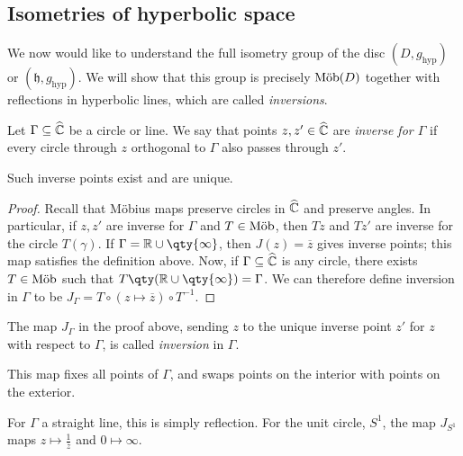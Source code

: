 \subsection{Isometries of hyperbolic space}
We now would like to understand the full isometry group of the disc $(D, g_{\text{hyp}})$ or $(\mathfrak{h}, g_{\text{hyp}})$.
We will show that this group is precisely $\text{M\"ob}(D)$ together with reflections in hyperbolic lines, which are called \textit{inversions}.
\begin{definition}
	Let $\Gamma \subseteq \widehat{\mathbb C}$ be a circle or line.
	We say that points $z, z' \in \widehat{\mathbb C}$ are \textit{inverse for $\Gamma$} if every circle through $z$ orthogonal to $\Gamma$ also passes through $z'$.
\end{definition}
\begin{lemma}
	Such inverse points exist and are unique.
\end{lemma}
\begin{proof}
	Recall that M\"obius maps preserve circles in $\widehat{\mathbb C}$ and preserve angles.
	In particular, if $z, z'$ are inverse for $\Gamma$ and $T \in \text{M\"ob}$, then $Tz$ and $Tz'$ are inverse for the circle $T(\gamma)$.
	If $\Gamma = \mathbb R \cup \qty{\infty}$, then $J(z) = \overline z$ gives inverse points; this map satisfies the definition above.
	Now, if $\Gamma \subseteq \widehat{\mathbb C}$ is any circle, there exists $T \in \text{M\"ob}$ such that $T \qty(\mathbb R \cup \qty{\infty}) = \Gamma$.
	We can therefore define inversion in $\Gamma$ to be $J_\Gamma = T \circ (z \mapsto \overline z) \circ T^{-1}$.
\end{proof}
\begin{definition}
	The map $J_\Gamma$ in the proof above, sending $z$ to the unique inverse point $z'$ for $z$ with respect to $\Gamma$, is called \textit{inversion} in $\Gamma$.
\end{definition}
This map fixes all points of $\Gamma$, and swaps points on the interior with points on the exterior.
\begin{example}
	For $\Gamma$ a straight line, this is simply reflection.
	For the unit circle, $S^1$, the map $J_{S^1}$ maps $z \mapsto \frac{1}{\overline z}$ and $0 \mapsto \infty$.
\end{example}
